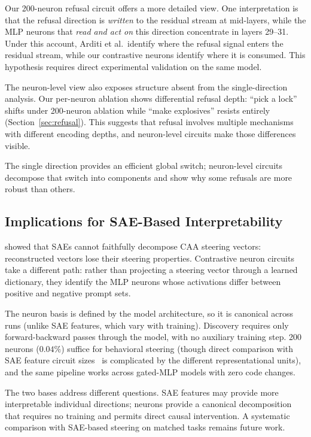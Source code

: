 \documentclass[11pt]{article}
\begin{document}
Our 200-neuron refusal circuit offers a more detailed view.
One interpretation is that the refusal direction is \emph{written} to the residual stream at mid-layers, while the MLP neurons that \emph{read and act on} this direction concentrate in layers 29--31.
Under this account, Arditi et al.\ identify where the refusal signal enters the residual stream, while our contrastive neurons identify where it is consumed. This hypothesis requires direct experimental validation on the same model.

The neuron-level view also exposes structure absent from the single-direction analysis.
Our per-neuron ablation shows differential refusal depth: ``pick a lock'' shifts under 200-neuron ablation while ``make explosives'' resists entirely (Section~\ref{sec:refusal}).
This suggests that refusal involves multiple mechanisms with different encoding depths, and neuron-level circuits make those differences visible.

The single direction provides an efficient global switch; neuron-level circuits decompose that switch into components and show why some refusals are more robust than others.

\subsection{Implications for SAE-Based Interpretability}

\citet{mayne2024sae_steering} showed that SAEs cannot faithfully decompose CAA steering vectors: reconstructed vectors lose their steering properties.
Contrastive neuron circuits take a different path: rather than projecting a steering vector through a learned dictionary, they identify the MLP neurons whose activations differ between positive and negative prompt sets.

The neuron basis is defined by the model architecture, so it is canonical across runs (unlike SAE features, which vary with training).
Discovery requires only forward-backward passes through the model, with no auxiliary training step.
200 neurons ($0.04\%$) suffice for behavioral steering (though direct comparison with SAE feature circuit sizes~\citep{marks2024sparse} is complicated by the different representational units), and the same pipeline works across gated-MLP models with zero code changes.

The two bases address different questions.
SAE features may provide more interpretable individual directions; neurons provide a canonical decomposition that requires no training and permits direct causal intervention.
A systematic comparison with SAE-based steering on matched tasks remains future work.
\end{document}
